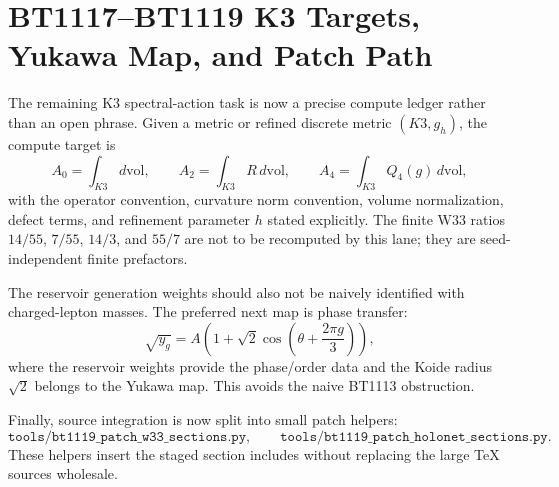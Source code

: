 \section{BT1117--BT1119 K3 Targets, Yukawa Map, and Patch Path}
\label{sec:bt1117-bt1119-k3-yukawa-patch-report}

The remaining K3 spectral-action task is now a precise compute ledger rather than an open phrase.  Given a metric or refined discrete metric $(K3,g_h)$, the compute target is
\[
A_0=\int_{K3}d\mathrm{vol},
\qquad
A_2=\int_{K3}R\,d\mathrm{vol},
\qquad
A_4=\int_{K3}Q_4(g)\,d\mathrm{vol},
\]
with the operator convention, curvature norm convention, volume normalization, defect terms, and refinement parameter $h$ stated explicitly.  The finite W33 ratios $14/55$, $7/55$, $14/3$, and $55/7$ are not to be recomputed by this lane; they are seed-independent finite prefactors.

The reservoir generation weights should also not be naively identified with charged-lepton masses.  The preferred next map is phase transfer:
\[
\sqrt{y_g}=A\left(1+\sqrt2\cos\left(\theta+\frac{2\pi g}{3}\right)\right),
\]
where the reservoir weights provide the phase/order data and the Koide radius $\sqrt2$ belongs to the Yukawa map.  This avoids the naive BT1113 obstruction.

Finally, source integration is now split into small patch helpers:
\[
\texttt{tools/bt1119\_patch\_w33\_sections.py},
\qquad
\texttt{tools/bt1119\_patch\_holonet\_sections.py}.
\]
These helpers insert the staged section includes without replacing the large TeX sources wholesale.
